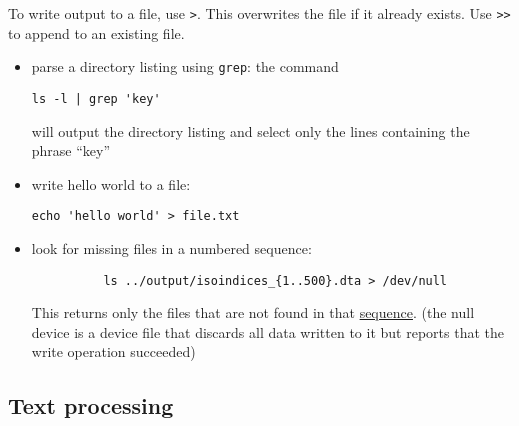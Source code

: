 To write output to a file, use \texttt{>}.
This overwrites the file if it already exists.
Use \texttt{>>} to append to an existing file.


\begin{itemize}
	\item parse a directory listing using \texttt{grep}: the command
	\begin{verbatim}ls -l | grep 'key'\end{verbatim}
	will output the directory listing and select only the lines containing the phrase ``key''
	\item write hello world to a file:
	\begin{verbatim}echo 'hello world' > file.txt\end{verbatim}
	\item look for missing files in a numbered sequence:
		  \begin{verbatim}
		  ls ../output/isoindices_{1..500}.dta > /dev/null
		  \end{verbatim}
		  This returns only the files that are not found in that \href{http://www.thelinuxrain.com/articles/building-sequences-of-numbers-on-the-command-line}{sequence}.
		  (the null device is a device file that discards all data written to it but reports that the write operation succeeded)
\end{itemize}

\subsection{Text processing}


